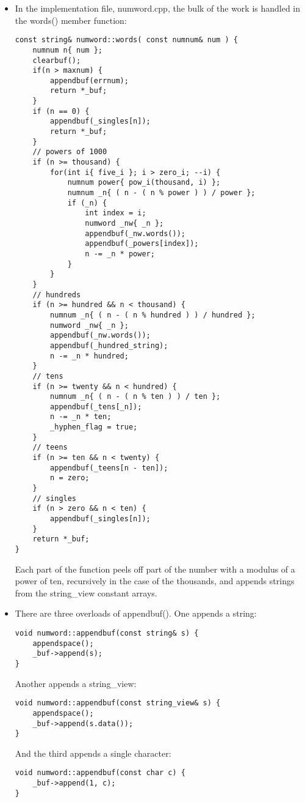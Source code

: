 \begin{itemize}
\item 
In the implementation file, numword.cpp, the bulk of the work is handled in the words() member function:

\begin{lstlisting}[style=styleCXX]
const string& numword::words( const numnum& num ) {
	numnum n{ num };
	clearbuf();
	if(n > maxnum) {
		appendbuf(errnum);
		return *_buf;
	}
	if (n == 0) {
		appendbuf(_singles[n]);
		return *_buf;
	}
	// powers of 1000
	if (n >= thousand) {
		for(int i{ five_i }; i > zero_i; --i) {
			numnum power{ pow_i(thousand, i) };
			numnum _n{ ( n - ( n % power ) ) / power };
			if (_n) {
				int index = i;
				numword _nw{ _n };
				appendbuf(_nw.words());
				appendbuf(_powers[index]);
				n -= _n * power;
			}
		}
	}
	// hundreds
	if (n >= hundred && n < thousand) {
		numnum _n{ ( n - ( n % hundred ) ) / hundred };
		numword _nw{ _n };
		appendbuf(_nw.words());
		appendbuf(_hundred_string);
		n -= _n * hundred;
	}
	// tens
	if (n >= twenty && n < hundred) {
		numnum _n{ ( n - ( n % ten ) ) / ten };
		appendbuf(_tens[_n]);
		n -= _n * ten;
		_hyphen_flag = true;
	}
	// teens
	if (n >= ten && n < twenty) {
		appendbuf(_teens[n - ten]);
		n = zero;
	}
	// singles
	if (n > zero && n < ten) {
		appendbuf(_singles[n]);
	}
	return *_buf;
}
\end{lstlisting}

Each part of the function peels off part of the number with a modulus of a power of ten, recursively in the case of the thousands, and appends strings from the string\_view constant arrays.

\item 
There are three overloads of appendbuf(). One appends a string:

\begin{lstlisting}[style=styleCXX]
void numword::appendbuf(const string& s) {
	appendspace();
	_buf->append(s);
}
\end{lstlisting}

Another appends a string\_view:

\begin{lstlisting}[style=styleCXX]
void numword::appendbuf(const string_view& s) {
	appendspace();
	_buf->append(s.data());
}
\end{lstlisting}

And the third appends a single character:

\begin{lstlisting}[style=styleCXX]
void numword::appendbuf(const char c) {
	_buf->append(1, c);
}
\end{lstlisting}


\end{itemize}
